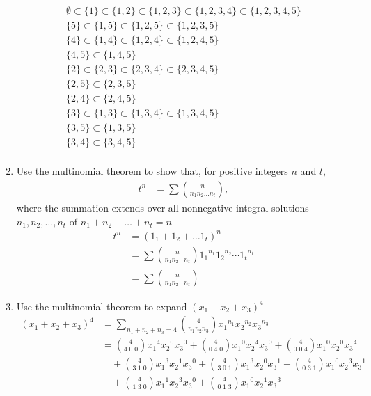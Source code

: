 \documentclass{article}
\begin{document}
\begin{enumerate}
\begin{align*}
  \emptyset\subset\{1\}\subset\{1,2\}\subset\{1,2,3\}\subset\{1,2,3,4\}\subset\{1,2,3,4,5\}\\
  \{5\}\subset\{1,5\}\subset\{1,2,5\}\subset\{1,2,3,5\}\\
  \{4\}\subset\{1,4\}\subset\{1,2,4\}\subset\{1,2,4,5\}\\
  \{4,5\}\subset\{1,4,5\}\\
  \{2\}\subset\{2,3\}\subset\{2,3,4\}\subset\{2,3,4,5\}\\
  \{2,5\}\subset\{2,3,5\}\\
  \{2,4\}\subset\{2,4,5\}\\
  \{3\}\subset\{1,3\}\subset\{1,3,4\}\subset\{1,3,4,5\}\\
  \{3,5\}\subset\{1,3,5\}\\
  \{3,4\}\subset\{3,4,5\}\\
\end{align*}
\setcounter{enumi}{36}\item
Use the multinomial theorem to show that, for positive integers $n$ and $t$,
\begin{align*}
  t^n&=\sum{\binom{n}{n_1n_2\dots n_t}},
\end{align*}
where the summation extends over all nonnegative integral solutions $n_1,n_2,\dots,n_t$ of $n_1+n_2+\dots+n_t=n$
\begin{align*}
  t^n&=(1_1+1_2+\dots1_t)^n\\
  &=\sum{\binom{n}{n_1n_2\cdots n_t}{1_1}^{n_1}{1_2}^{n_2}\cdots{1_t}^{n_t}}\\
  &=\sum{\binom{n}{n_1n_2\cdots n_t}}
\end{align*}
\item
Use the multinomial theorem to expand $(x_1+x_2+x_3)^4$
\begin{align*}
  (x_1+x_2+x_3)^4&=\sum\limits_{n_1+n_2+n_3=4}{\binom{4}{n_1n_2n_3}{x_1}^{n_1}{x_2}^{n_2}{x_3}^{n_3}}\\
  &=\binom{4}{4\;0\;0}{x_1}^4{x_2}^0{x_3}^0
  +\binom{4}{0\;4\;0}{x_1}^0{x_2}^4{x_3}^0
  +\binom{4}{0\;0\;4}{x_1}^0{x_2}^0{x_3}^4\\
  &\quad+\binom{4}{3\;1\;0}{x_1}^3{x_2}^1{x_3}^0
  +\binom{4}{3\;0\;1}{x_1}^3{x_2}^0{x_3}^1
  +\binom{4}{0\;3\;1}{x_1}^0{x_2}^3{x_3}^1\\
  &\quad+\binom{4}{1\;3\;0}{x_1}^1{x_2}^3{x_3}^0
  +\binom{4}{0\;1\;3}{x_1}^0{x_2}^1{x_3}^3

\end{align*}
\end{enumerate}
\end{document}
